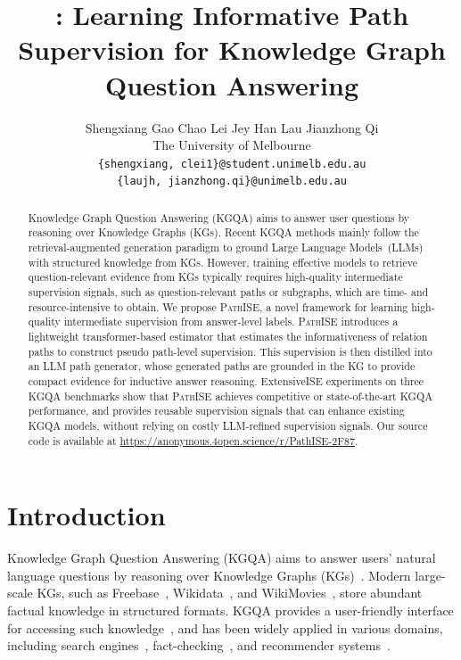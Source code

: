 \documentclass{article}
\title{\framework: Learning Informative Path Supervision for Knowledge Graph Question Answering}
\author{%
  Shengxiang Gao \qquad Chao Lei \qquad Jey Han Lau \qquad Jianzhong Qi\\
  The University of Melbourne \\
  \texttt{\{shengxiang, clei1\}@student.unimelb.edu.au} \\ 
  \texttt{\{laujh, jianzhong.qi\}@unimelb.edu.au}
}
\newcommand{\framework}{\textsc{PathISE}\xspace}
\begin{document}
\maketitle

\begin{abstract}\label{abstract}
  Knowledge Graph Question Answering (KGQA) aims to answer user questions by reasoning over Knowledge Graphs (KGs). Recent KGQA methods mainly follow the retrieval-augmented generation paradigm to ground Large Language Models~(LLMs) with structured knowledge from KGs. However, training effective models to retrieve question-relevant evidence from KGs typically requires high-quality intermediate supervision signals, such as question-relevant paths or subgraphs, which are time- and resource-intensive to obtain. We propose \framework{}, a novel framework for learning high-quality intermediate supervision from answer-level labels. \framework{} introduces a lightweight transformer-based estimator that estimates the informativeness of relation paths to construct pseudo path-level supervision. This supervision is then distilled into an LLM path generator, whose generated paths are grounded in the KG to provide compact evidence for inductive answer reasoning. ExtensiveISE experiments on three KGQA benchmarks show that \framework achieves competitive or state-of-the-art KGQA performance, and provides reusable supervision signals that can enhance existing KGQA models, without relying on costly LLM-refined supervision signals. Our source code is available at \url{https://anonymous.4open.science/r/PathISE-2F87}.
\end{abstract}

\section{Introduction}\label{sec:introduction}

Knowledge Graph Question Answering (KGQA) aims to answer users' natural language questions by reasoning over Knowledge Graphs (KGs)~\citep{lan_complexkbqa_2023, pan_unifyingSurvey_2024}. 
Modern large-scale KGs, such as Freebase~\citep{bollacker_freebase_2008}, Wikidata~\citep{vrandecic_wikidata_2014}, and WikiMovies~\citep{puerto_metaqa_2023}, store abundant factual knowledge in structured formats. 
KGQA provides a user-friendly interface for accessing such knowledge~\citep{gu_beyond_2021}, and has been widely applied in various domains, including search engines~\citep{dess_kgsearch_2022}, fact-checking~\citep{gong_multiagent_2026}, and recommender systems~\citep{wang_kgrecom_2025}.
\end{document}
